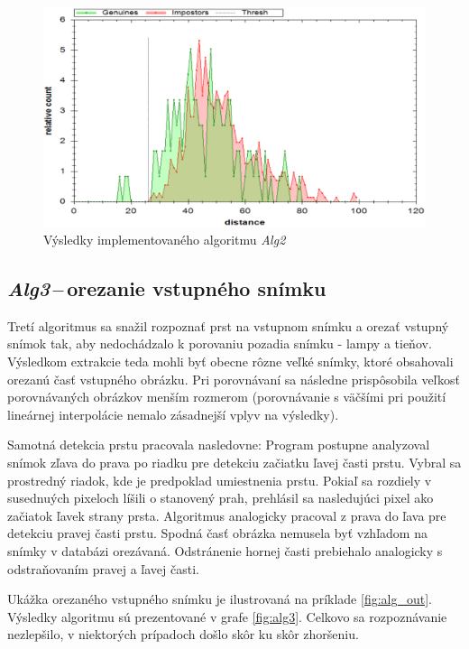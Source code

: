 \documentclass[11pt,a4paper]{article}
\begin{document}
\vfill
\begin{figure}[ht!]
	\centering
	\includegraphics[width=17cm]{fig/alg2.eps}
	\caption{\label{fig:alg2} Výsledky implementovaného algoritmu \emph{Alg2}}
\end{figure}
\vfill
\vfill

\clearpage
\subsection{\emph{Alg3}\,--\,orezanie vstupného snímku} \label{alg3}

Tretí algoritmus sa snažil rozpoznať prst na vstupnom snímku a orezať vstupný
snímok tak, aby nedochádzalo k porovaniu pozadia snímku - lampy a tieňov.
Výsledkom extrakcie teda mohli byť obecne rôzne veľké snímky, ktoré obsahovali
orezanú časť vstupného obrázku. Pri porovnávaní sa následne prispôsobila veľkosť
porovnávaných obrázkov menším rozmerom (porovnávanie s väčšími pri použití
lineárnej interpolácie nemalo zásadnejší vplyv na výsledky).

Samotná detekcia prstu pracovala nasledovne: Program postupne analyzoval snímok
zľava do prava po riadku pre detekciu začiatku ľavej časti prstu. Vybral sa
prostredný riadok, kde je predpoklad u\-mie\-stne\-nia prstu. Pokiaľ sa rozdiely
v susednuých pixeloch líšili o stanovený prah, prehlásil sa nasledujúci pixel
ako začiatok ľavek strany prsta. Algoritmus analogicky pracoval z prava do ľava
pre detekciu pravej časti prstu. Spodná časť obrázka nemusela byť vzhľadom na
snímky v databázi orezávaná. Odstránenie hornej časti prebiehalo analogicky
s odstraňovaním pravej a ľavej časti.

Ukážka orezaného vstupného snímku je ilustrovaná na príklade \ref{fig:alg_out}.
Výsledky algoritmu sú prezentované v grafe \ref{fig:alg3}. Celkovo sa
rozpoznávanie nezlepšilo, v niektorých prípadoch došlo skôr ku skôr zhoršeniu.
\end{document}
